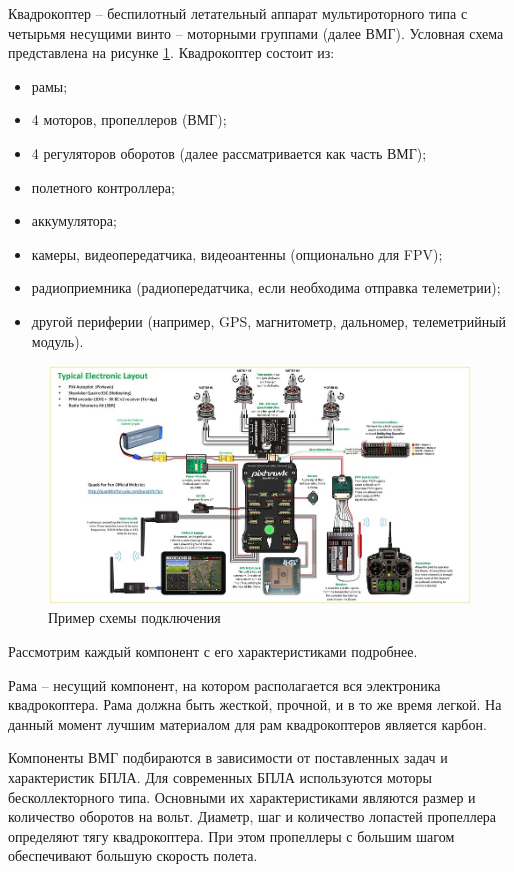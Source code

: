 Квадрокоптер -- беспилотный летательный аппарат мультироторного типа с четырьмя несущими винто -- моторными группами (далее ВМГ). Условная схема представлена на рисунке \ref{fig:pix}.
Квадрокоптер состоит из:
\begin{itemize}
	\item рамы;
	\item 4 моторов, пропеллеров (ВМГ);
	\item 4 регуляторов оборотов (далее рассматривается как часть ВМГ);
	\item полетного контроллера;
	\item аккумулятора;
	\item камеры, видеопередатчика, видеоантенны (опционально для FPV);
	\item радиоприемника (радиопередатчика, если необходима отправка телеметрии);
	\item другой периферии (например, GPS, магнитометр, дальномер, телеметрийный модуль).
\end{itemize}

 \begin{figure}[H]
 	\centering
 	\includegraphics[width=0.5\linewidth]{../RW/pics/pix}
 	\caption{Пример схемы подключения
 	}
 	\label{fig:pix}
 \end{figure}

Рассмотрим каждый компонент с его характеристиками подробнее.

Рама -- несущий компонент, на котором располагается вся электроника квадрокоптера. Рама должна быть жесткой, прочной, и в то же время легкой. На данный момент лучшим материалом для рам квадрокоптеров является карбон.

Компоненты ВМГ подбираются в зависимости от поставленных задач и характеристик БПЛА. Для современных БПЛА используются моторы бесколлекторного типа. Основными их характеристиками являются размер и количество оборотов на вольт.
Диаметр, шаг и количество лопастей пропеллера определяют тягу квадрокоптера. При этом пропеллеры с большим шагом обеспечивают большую скорость полета.

